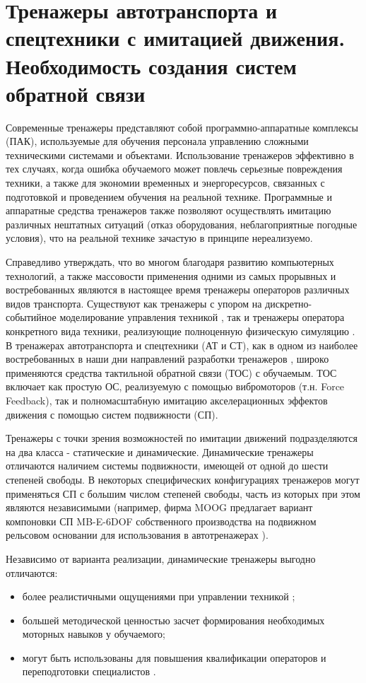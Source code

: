 \chapter{Тренажеры автотранспорта и спецтехники с имитацией движения. Необходимость создания систем обратной связи} \label{chapt1}
Современные тренажеры представляют собой программно-аппаратные комплексы (ПАК), используемые для обучения персонала управлению сложными техническими системами и объектами.
Использование тренажеров эффективно в тех случаях, когда ошибка обучаемого может повлечь серьезные повреждения техники, а также для экономии временных и энергоресурсов, связанных с подготовкой и проведением обучения на реальной технике.
Программные и аппаратные средства тренажеров также позволяют осуществлять имитацию различных нештатных ситуаций (отказ оборудования, неблагоприятные погодные условия), что на реальной технике зачастую в принципе нереализуемо.

Справедливо утверждать, что во многом благодаря развитию компьютерных технологий, а также массовости применения одними из самых прорывных и востребованных являются в настоящее время тренажеры операторов различных видов транспорта.
Существуют как тренажеры с упором на дискретно-событийное моделирование управления техникой \cite{Baranov2012Sim, Baranov2017Sim, Baranov2021Sim}, так и тренажеры оператора конкретного вида техники, реализующие полноценную физическую симуляцию \cite{KopytenkovaAlievPgupsSim}.
В тренажерах автотранспорта и спецтехники (АТ и СТ), как в одном из наиболее востребованных в наши дни направлений разработки тренажеров \cite{DolgichImmersive, TkachPhD, FominArSim2022, Arioui2010}, широко применяются средства тактильной обратной связи (ТОС) с обучаемым. ТОС включает как простую ОС, реализуемую с помощью вибромоторов (т.н. Force Feedback), так и полномасштабную имитацию акселерационных эффектов движения с помощью систем подвижности (СП).

Тренажеры с точки зрения возможностей по имитации движений подразделяются на два класса - статические и динамические.
Динамические тренажеры отличаются наличием системы подвижности, имеющей от одной до шести степеней свободы.
В некоторых специфических конфигурациях тренажеров могут применяться СП с большим числом степеней свободы,
часть из которых при этом являются независимыми (например, фирма MOOG предлагает вариант компоновки СП MB-E-6DOF собственного производства на подвижном рельсовом основании для использования в автотренажерах \cite{Zuev, moogProtocol, Sloushch1}).

Независимо от варианта реализации, динамические тренажеры выгодно отличаются:
\begin{itemize}
\item{более реалистичными ощущениями при управлении техникой} \cite{Casas2014};
\item{большей методической ценностью засчет формирования необходимых моторных навыков у обучаемого};
\item{могут быть использованы для повышения квалификации операторов и переподготовки специалистов} \cite{Baranov2021Sim}.
\end{itemize}

